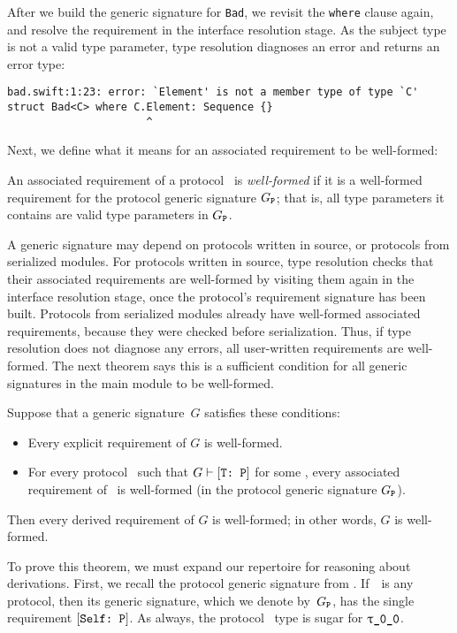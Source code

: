 \documentclass[../generics]{subfiles}
\begin{document}
After we build the generic signature for \texttt{Bad}, we revisit the \texttt{where} clause again, and resolve the requirement in the interface resolution stage. As the subject type is not a valid type parameter, type resolution diagnoses an error and returns an error type:
\begin{Verbatim}
bad.swift:1:23: error: `Element' is not a member type of type `C'
struct Bad<C> where C.Element: Sequence {}
                      ^
\end{Verbatim}

Next, we define what it means for an associated requirement to be well-formed:
\begin{definition}
An associated requirement of a protocol \tP\ is \emph{well-formed} if it is a well-formed requirement for the protocol generic signature $G_{\texttt{P}}$; that is, all type parameters it contains are valid type parameters in $G_{\texttt{P}}$.
\end{definition}

A generic signature may depend on protocols written in source, or protocols from serialized modules. For protocols written in source, type resolution checks that their associated requirements are well-formed by visiting them again in the interface resolution stage, once the protocol's requirement signature has been built. Protocols from serialized modules already have well-formed associated requirements, because they were checked before serialization. Thus, if type resolution does not diagnose any errors, all user-written requirements are well-formed. The next theorem says this is a sufficient condition for all generic signatures in the main module to be well-formed.

\begin{theorem}\label{valid theorem}
Suppose that a generic signature~$G$ satisfies these conditions:
\begin{itemize}
\item Every explicit requirement of $G$ is well-formed.
\item For every protocol \tP\ such that $G\vdash[\texttt{T:~P}]$ for some \tT, every associated requirement of \tP\ is well-formed (in the protocol generic signature $G_{\texttt{P}}$).
\end{itemize}
Then every derived requirement of $G$ is well-formed; in other words, $G$ is well-formed.
\end{theorem}
To prove this theorem, we must expand our repertoire for reasoning about derivations. First, we recall the protocol generic signature from . If~\tP\ is any protocol, then its generic signature, which we denote by~$G_{\texttt{P}}$, has the single requirement $[\texttt{Self:~P}]$. As always, the protocol \tSelf\ type is sugar for $\rT$.
\end{document}
